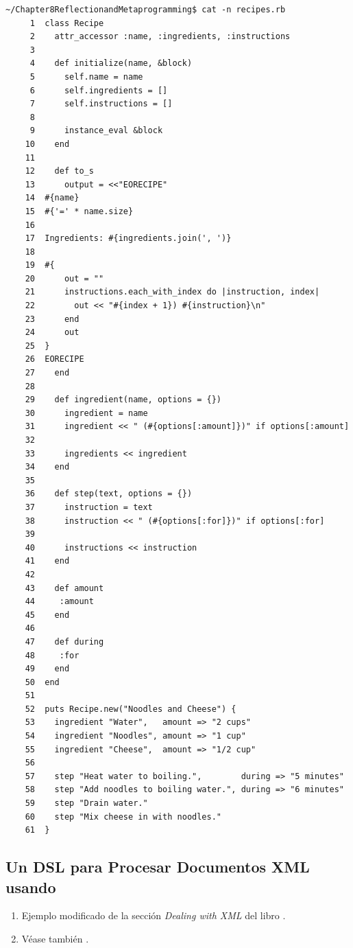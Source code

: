 \begin{verbatim}
~/Chapter8ReflectionandMetaprogramming$ cat -n recipes.rb 
     1  class Recipe
     2    attr_accessor :name, :ingredients, :instructions
     3  
     4    def initialize(name, &block)
     5      self.name = name
     6      self.ingredients = []
     7      self.instructions = []
     8  
     9      instance_eval &block
    10    end
    11  
    12    def to_s
    13      output = <<"EORECIPE"
    14  #{name}
    15  #{'=' * name.size}
    16  
    17  Ingredients: #{ingredients.join(', ')}
    18  
    19  #{
    20      out = ""
    21      instructions.each_with_index do |instruction, index|
    22        out << "#{index + 1}) #{instruction}\n"
    23      end
    24      out
    25  }
    26  EORECIPE
    27    end
    28  
    29    def ingredient(name, options = {})
    30      ingredient = name
    31      ingredient << " (#{options[:amount]})" if options[:amount]
    32  
    33      ingredients << ingredient
    34    end
    35  
    36    def step(text, options = {})
    37      instruction = text
    38      instruction << " (#{options[:for]})" if options[:for]
    39  
    40      instructions << instruction
    41    end
    42  
    43    def amount 
    44     :amount 
    45    end
    46  
    47    def during 
    48     :for
    49    end
    50  end
    51  
    52  puts Recipe.new("Noodles and Cheese") {
    53    ingredient "Water",   amount => "2 cups"
    54    ingredient "Noodles", amount => "1 cup"
    55    ingredient "Cheese",  amount => "1/2 cup"
    56  
    57    step "Heat water to boiling.",        during => "5 minutes"
    58    step "Add noodles to boiling water.", during => "6 minutes"
    59    step "Drain water."
    60    step "Mix cheese in with noodles."
    61  }
\end{verbatim}


\subsection{Un DSL para Procesar Documentos XML usando }

\begin{enumerate}
\item 
Ejemplo modificado de la sección \emph{Dealing with XML} del libro
\cite{ER}. 
\item 
Véase también 
.
\end{enumerate}

